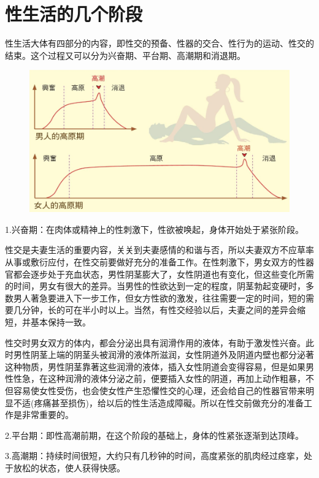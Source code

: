 \documentclass[12pt,UTF8]{ctexbook}
\begin{document}
\chapter{性生活的几个阶段}

性生活大体有四部分的内容，即性交的预备、性器的交合、性行为的运动、性交的结束。这个过程又可以分为兴奋期、平台期、高潮期和消退期。

\begin{figure}[htbp]
	\includegraphics[width=1\linewidth]{6}
	\caption{}
	\label{fig:1}
\end{figure}

1.兴奋期：在肉体或精神上的性刺激下，性欲被唤起，身体开始处于紧张阶段。

性交是夫妻生活的重要内容，关关到夫妻感情的和谐与否，所以夫妻双方不应草率从事或敷衍应付，在性交前要做好充分的准备工作。在性刺激下，男女双方的性器官都会逐步处于充血状态，男性阴茎膨大了，女性阴道也有变化，但这些变化所需的时间，男女有很大的差异。当男性的性欲达到一定的程度，阴茎勃起变硬时，多数男人著急要进入下一步工作，但女方性欲的激发，往往需要一定的时间，短的需要几分钟，长的可在半小时以上。当然，有性交经验以后，夫妻之间的差异会缩短，并基本保持一致。

性交时男女双方的体内，都会分泌出具有润滑作用的液体，有助于激发性兴奋。此时男性阴茎上端的阴茎头被润滑的液体所滋润，女性阴道外及阴道内壁也都分泌著这种物质，男性阴茎靠著这些润滑的液体，插入女性阴道会变得容易，但是如果男性性急，在这种润滑的液体分泌之前，便要插入女性的阴道，再加上动作粗暴，不但容易使女性受伤，也会使女性产生恐懼性交的心理，还会给自己的性器官带来明显不适(疼痛甚至损伤)，给以后的性生活造成障礙。所以在性交前做充分的准备工作是非常重要的。

2.平台期：即性高潮前期，在这个阶段的基础上，身体的性紧张逐渐到达顶峰。

3.高潮期：持续时间很短，大约只有几秒钟的时间，高度紧张的肌肉经过痉挛，处于放松的状态，使人获得快感。
\end{document}
